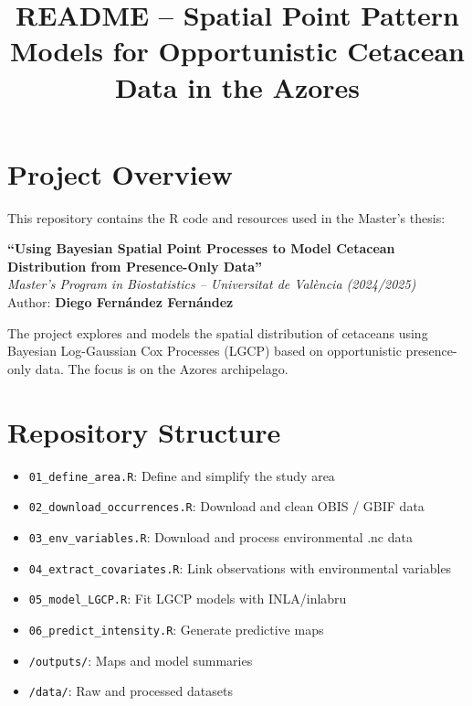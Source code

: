 \documentclass[12pt]{article}
\title{\textbf{README -- Spatial Point Pattern Models for Opportunistic Cetacean Data in the Azores}}
\date{}
\begin{document}
\maketitle

\section*{Project Overview}
This repository contains the R code and resources used in the Master's thesis:

\textbf{``Using Bayesian Spatial Point Processes to Model Cetacean Distribution from Presence-Only Data''} \\
\textit{Master’s Program in Biostatistics – Universitat de València (2024/2025)} \\
Author: \textbf{Diego Fernández Fernández}

\bigskip

The project explores and models the spatial distribution of cetaceans using Bayesian Log-Gaussian Cox Processes (LGCP) based on opportunistic presence-only data. The focus is on the Azores archipelago.

\section*{Repository Structure}
\begin{itemize}
  \item \texttt{01\_define\_area.R}: Define and simplify the study area
  \item \texttt{02\_download\_occurrences.R}: Download and clean OBIS / GBIF data
  \item \texttt{03\_env\_variables.R}: Download and process environmental .nc data
  \item \texttt{04\_extract\_covariates.R}: Link observations with environmental variables
  \item \texttt{05\_model\_LGCP.R}: Fit LGCP models with INLA/inlabru
  \item \texttt{06\_predict\_intensity.R}: Generate predictive maps
  \item \texttt{/outputs/}: Maps and model summaries
  \item \texttt{/data/}: Raw and processed datasets
\end{itemize}
\end{document}
